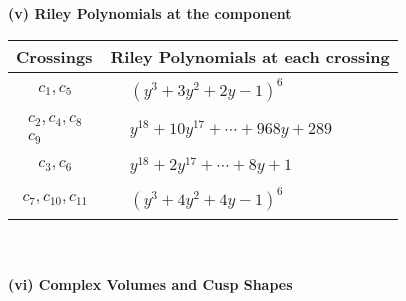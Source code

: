 \documentclass[1p]{elsarticle_modified}
\theoremstyle{definition}
\begin{document}
\newpage\renewcommand{\arraystretch}{1}
\flushleft \textbf{(v) Riley Polynomials at the component}\newline \\
\begin{tabular}{m{50pt}|m{274pt}}
Crossings & \hspace{64pt}Riley Polynomials at each crossing \\
\hline $$\begin{aligned}c_{1},c_{5}\end{aligned}$$&$\begin{aligned}
&(y^3+3 y^2+2 y-1)^6
\end{aligned}$\\
\hline $$\begin{aligned}c_{2},c_{4},c_{8}\\c_{9}\end{aligned}$$&$\begin{aligned}
&y^{18}+10 y^{17}+\cdots+968 y+289
\end{aligned}$\\
\hline $$\begin{aligned}c_{3},c_{6}\end{aligned}$$&$\begin{aligned}
&y^{18}+2 y^{17}+\cdots+8 y+1
\end{aligned}$\\
\hline $$\begin{aligned}c_{7},c_{10},c_{11}\end{aligned}$$&$\begin{aligned}
&(y^3+4 y^2+4 y-1)^6
\end{aligned}$\\
\hline
\end{tabular}\\~\\
\newpage\flushleft \textbf{(vi) Complex Volumes and Cusp Shapes}
\end{document}
